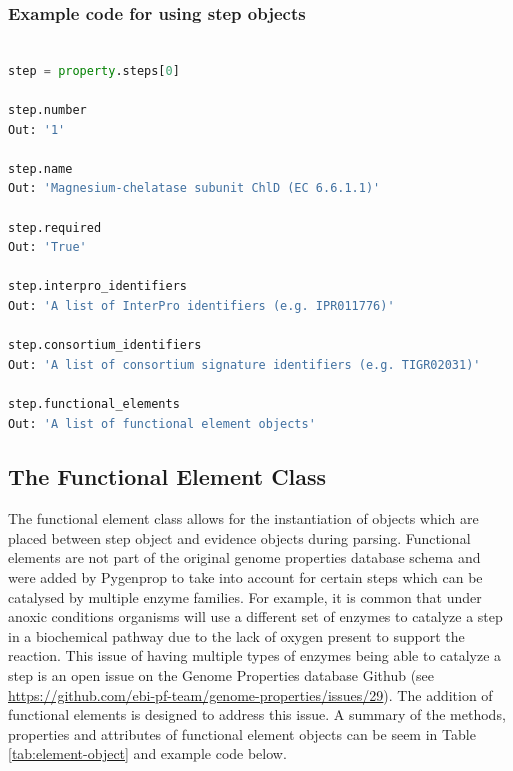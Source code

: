 \subsubsection{Example code for using step objects}

\begin{lstlisting}[language=Python]

step = property.steps[0]
	
step.number
Out: '1'

step.name
Out: 'Magnesium-chelatase subunit ChlD (EC 6.6.1.1)'

step.required
Out: 'True'

step.interpro_identifiers
Out: 'A list of InterPro identifiers (e.g. IPR011776)'

step.consortium_identifiers 
Out: 'A list of consortium signature identifiers (e.g. TIGR02031)'

step.functional_elements
Out: 'A list of functional element objects'

\end{lstlisting}

\subsection{The Functional Element Class}

The functional element class allows for the instantiation of objects which are placed between step object and evidence objects during parsing. Functional elements are not part of the original genome properties database schema and were added by Pygenprop to take into account for certain steps which can be catalysed by multiple enzyme families. For example, it is common that under anoxic conditions organisms will use a different set of enzymes to catalyze a step in a biochemical pathway due to the lack of oxygen present to support the reaction. This issue of having multiple types of enzymes being able to catalyze a step is an open issue on the Genome Properties database Github (see \href{https://github.com/ebi-pf-team/genome-properties/issues/29}{https://github.com/ebi-pf-team/genome-properties/issues/29}). The addition of functional elements is designed to address this issue.  A summary of the methods, properties and attributes of functional element objects can be seem in Table \ref{tab:element-object} and example code below.

